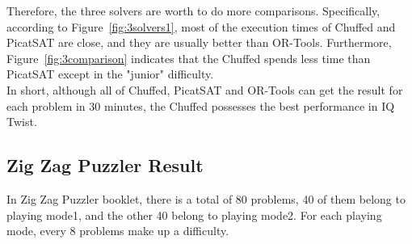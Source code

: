 Therefore, the three solvers are worth to do more comparisons. Specifically, according to Figure~\ref{fig:3solvers1}, most of the execution times of Chuffed and PicatSAT are close, and they are usually better than OR-Tools.
Furthermore, Figure~\ref{fig:3comparison} indicates that the Chuffed spends less time than PicatSAT except in the "junior" difficulty.
\\In short, although all of Chuffed, PicatSAT and OR-Tools can get the result for each problem in 30 minutes, the Chuffed possesses the best performance in IQ Twist.
\subsection{Zig Zag Puzzler Result}
\label{sec:Zig Zag Puzzlerresult}
In Zig Zag Puzzler booklet, there is a total of 80 problems, 40 of them belong to playing mode1, and the other 40 belong to playing mode2. For each playing mode, every 8 problems make up a difficulty. 

